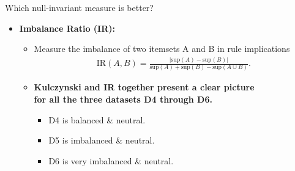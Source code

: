 \documentclass[aspectratio=169,t,xcolor=dvipsnames]{beamer}
\begin{document}
  {
    \begin{frame}{Which null-invariant measure is better?}
    \begin{itemize}
      \item \textbf{Imbalance Ratio (IR):}
      \begin{itemize}
        \item Measure the imbalance of two itemsets A and B in rule implications
        \begin{align}
          \text{IR}(A,B) = \frac{|\text{sup}(A) - \text{sup}(B)|}{\text{sup}(A) + \text{sup}(B) - \text{sup}(A \cup B)}.
        \end{align}
        \item \textbf{Kulczynski and IR together present a clear picture \\ for all the three datasets D4 through D6.}
        \begin{itemize}
          \item D4  is balanced \& neutral.
          \item D5  is imbalanced \& neutral.
          \item D6  is very imbalanced \& neutral.
        \end{itemize}
      \end{itemize}
    \end{itemize}
    \centering
    \end{frame}
  }
\end{document}
